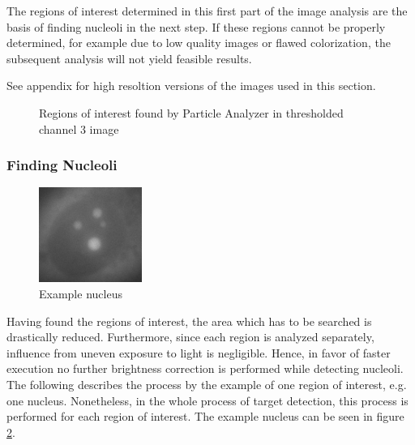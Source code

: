 \documentclass[a4paper, 12pt]{article}
\begin{document}
The regions of interest determined in this first part of the image analysis are
the basis of finding nucleoli in the next step. If these regions cannot be
properly determined, for example due to low quality images or flawed
colorization, the subsequent analysis will not yield feasible results.

See appendix for high resoltion versions of the images used in this section.

\begin{figure}[h]
\centering
{}
\caption{Regions of interest found by Particle Analyzer in thresholded channel 3
image}
\label{fig:channel3_rois}
\end{figure}

\subsubsection{Finding Nucleoli}

\begin{figure}
\vspace{-14pt}
\includegraphics[width=0.3\textwidth]{images/example_nucleus}
\caption{Example nucleus}
\label{fig:example_nucleus}
\vspace{-28pt}
\end{figure}
Having found the regions of interest, the area which has to be searched is
drastically reduced. Furthermore, since each region is analyzed separately,
influence from uneven exposure to light is negligible. Hence, in favor of
faster execution no further brightness correction is performed while detecting
nucleoli. The following describes the process by the example of one region of
interest, e.g. one nucleus. Nonetheless, in the whole process of target
detection, this process is performed for each region of interest. The example
nucleus can be seen in figure \ref{fig:example_nucleus}.
\end{document}
